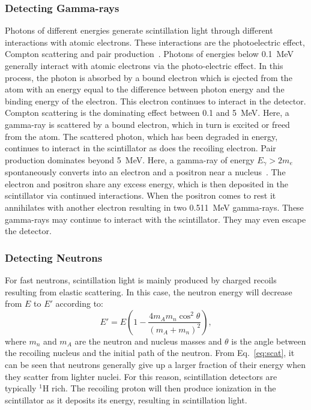 \documentclass[main.tex]{subfiles}
\begin{document}
\subsubsection{Detecting Gamma-rays}
Photons of different energies generate scintillation light through different interactions with atomic electrons. These interactions are the photoelectric effect, Compton scattering and pair production~\cite{Krane}. 
Photons of energies below \SI{0.1}{\MeV} generally interact with atomic electrons via the photo-electric effect. In this process, the photon is absorbed by a bound electron which is ejected from the atom with an energy equal to the difference between photon energy and the binding energy of the electron. This electron continues to interact in the detector.
Compton scattering is the dominating effect between 0.1 and \SI{5}{\MeV}. Here, a gamma-ray is scattered by a bound electron, which in turn is excited or freed from the atom. The scattered photon, which has been degraded in energy, continues to interact in the scintillator as does the recoiling electron.
Pair production dominates beyond \SI{5}{\MeV}. Here, a gamma-ray of energy $E_\gamma>2m_e$ spontaneously converts into an electron and a positron near a nucleus~\cite{Krane}. The electron and positron share any excess energy, which is then deposited in the scintillator via continued interactions. When the positron comes to rest it annihilates with another electron resulting in two \SI{0.511}{\MeV} gamma-rays. These gamma-rays may continue to interact with the scintillator. They may even escape the detector.


\subsubsection{Detecting Neutrons}
For fast neutrons, scintillation light is mainly produced by charged recoils resulting from elastic scattering. In this case, the neutron energy will decrease from $E$ to $E'$ according to:
\begin{equation}
	E' = E\left(1 - \frac{4m_A m_n \cos^2{\theta}}{\left(m_A + m_n\right)^2}\right),
	\label{eq:scat}
\end{equation}
where $m_n$ and $m_A$ are the neutron and nucleus masses and $\theta$ is the angle between the recoiling nucleus and the initial path of the neutron. From Eq.~\ref{eq:scat}, it can be seen that neutrons generally give up a larger fraction of their energy when they scatter from lighter nuclei. 
For this reason, scintillation detectors are typically $^1$H rich. The recoiling proton will then produce ionization in the scintillator as it deposits its energy, resulting in scintillation light. 
\end{document}
